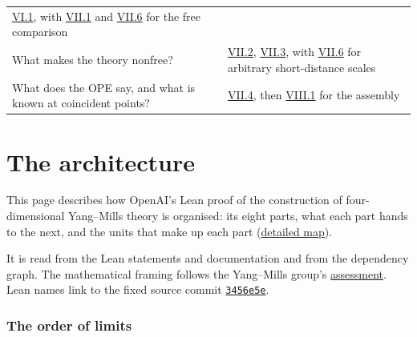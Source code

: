 \documentclass[
  letterpaper,
  11pt]{article}
\begin{document}
{\begin{longtable}[]{@{}
  >{\raggedright\arraybackslash}p{}
  >{\raggedright\arraybackslash}p{}@{}}
\href{https://github.com/scottnarmstrong/yang-mills-informalization/blob/main/outline/units/VI-1.md}{VI.1},
with
\href{https://github.com/scottnarmstrong/yang-mills-informalization/blob/main/outline/units/VII-1.md}{VII.1}
and
\href{https://github.com/scottnarmstrong/yang-mills-informalization/blob/main/outline/units/VII-6.md}{VII.6}
for the free comparison \\
What makes the theory nonfree? &
\href{https://github.com/scottnarmstrong/yang-mills-informalization/blob/main/outline/units/VII-2.md}{VII.2},
\href{https://github.com/scottnarmstrong/yang-mills-informalization/blob/main/outline/units/VII-3.md}{VII.3},
with
\href{https://github.com/scottnarmstrong/yang-mills-informalization/blob/main/outline/units/VII-6.md}{VII.6}
for arbitrary short-distance scales \\
What does the OPE say, and what is known at coincident points? &
\href{https://github.com/scottnarmstrong/yang-mills-informalization/blob/main/outline/units/VII-4.md}{VII.4},
then
\href{https://github.com/scottnarmstrong/yang-mills-informalization/blob/main/outline/units/VIII-1.md}{VIII.1}
for the assembly \\
\end{longtable}
}

\section{The architecture}\label{the-architecture}

This page describes how OpenAI's Lean proof of the construction of
four-dimensional Yang--Mills theory is organised: its eight parts, what
each part hands to the next, and the units that make up each part
(\href{https://github.com/scottnarmstrong/yang-mills-informalization/blob/main/outline/units.md}{detailed
map}).

It is read from the Lean statements and documentation and from the
dependency graph. The mathematical framing follows the Yang--Mills
group's
\href{https://github.com/yang-mills-group/YM/blob/main/docs/assessment-1.pdf}{assessment}.
Lean names link to the fixed source commit
\href{https://github.com/yang-mills-group/OpenAI-YM-20261028/tree/3456e5e75cf8d4cd558955a5c7638fba2d68f464}{\texttt{3456e5e}}.

\subsubsection{The order of limits}\label{the-order-of-limits}
\end{document}
